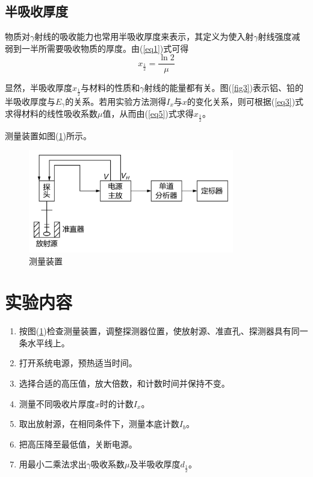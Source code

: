 \documentclass[a4paper]{article}
\begin{document}
\subsection{半吸收厚度}
物质对$\gamma$射线的吸收能力也常用半吸收厚度来表示，其定义为使入射$\gamma$射线强度减弱到一半所需要吸收物质的厚度。由(\ref{eq1})式可得
\begin{equation}
    x_{\frac12} = \frac{\ln2}{\mu}\label{eq5}
\end{equation}

显然，半吸收厚度$x_{\frac12}$与材料的性质和$\gamma$射线的能量都有关。图(\ref{fig3})表示铝、铅的半吸收厚度与$E_{\gamma}$的关系。若用实验方法测得$I_x$与$x$的变化关系，则可根据(\ref{eq3})式求得材料的线性吸收系数$\mu$值，从而由(\ref{eq5})式求得$x_{\frac12}$。

测量装置如图(\ref{fig2})所示。
\begin{figure}[!h]
    \centering
    \includegraphics[width=0.8\textwidth]{fig/fig2.pdf}
    \caption{测量装置}\label{fig2}
\end{figure}

\section{实验内容}
\begin{enumerate}
    \item 按图(\ref{fig2})检查测量装置，调整探测器位置，使放射源、准直孔、探测器具有同一条水平线上。
    \item 打开系统电源，预热适当时间。
    \item 选择合适的高压值，放大倍数，和计数时间并保持不变。
    \item 测量不同吸收片厚度$x$时的计数$I_x$。
    \item 取出放射源，在相同条件下，测量本底计数$I_b$。
    \item 把高压降至最低值，关断电源。
    \item 用最小二乘法求出$\gamma$吸收系数$\mu$及半吸收厚度$d_{\frac12}$。
\end{enumerate}
\end{document}
